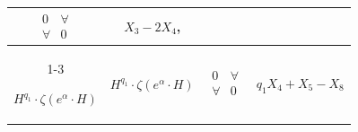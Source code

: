 \begin{center}
\begin{tabular}{|c|c|c|c|}
$\begin{matrix} 0 & \forall \\ \forall & 0\end{matrix}$ &


$X_3-2X_4$,\\


\cline{1-3}


$H^{q_1}\cdot\zeta(e^\alpha\cdot H)$ &


$H^{q_1}\cdot\zeta(e^\alpha\cdot H)$ &


$\begin{matrix} 0 & \forall \\ \forall & 0\end{matrix}$ &


$q_1X_4+X_5-X_8$\\


\hline


\end{tabular} 


\end{center} 





